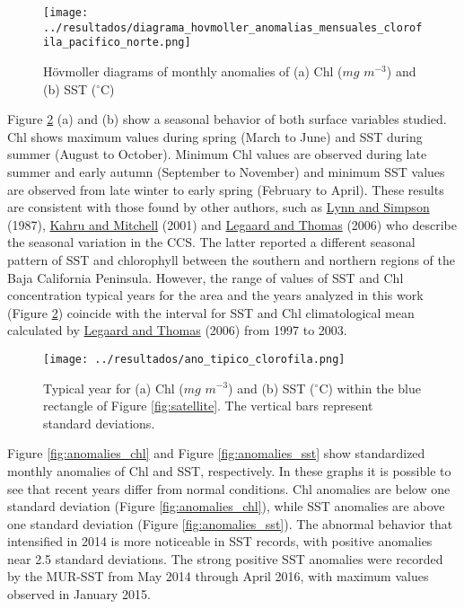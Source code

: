 \documentclass{article} %
\begin{document}
\begin{figure}
  \begin{center}
  \texttt{[image: ../resultados/diagrama\_hovmoller\_anomalias\_mensuales\_clorofila\_pacifico\_norte.png]}
  \caption{Hövmoller diagrams of monthly anomalies of (a) Chl ($mg$ $m^{-3}$) and (b) SST ($^{\circ}$C)}
  \label{fig:diagram}
  \end{center}
\end{figure}

Figure \ref{fig:typical} (a) and (b) show a seasonal behavior of both surface variables studied. Chl shows maximum values during spring (March to June) and SST during summer (August to October). Minimum Chl values are observed during late summer and early autumn (September to November) and minimum SST values are observed from late winter to early spring (February to April). These results are consistent with those found by other authors, such as \hyperlink{lynn}{Lynn and Simpson} (1987), \hyperlink{kahru}{Kahru and Mitchell} (2001) and \hyperlink{legaard}{Legaard and Thomas} (2006) who describe the seasonal variation in the CCS. The latter reported a different seasonal pattern of SST and chlorophyll between the southern and northern regions of the Baja California Peninsula. However, the range of values of SST and Chl concentration typical years for the area and the years analyzed in this work (Figure \ref{fig:typical}) coincide with the interval for SST and Chl climatological mean calculated by \hyperlink{legaard}{Legaard and Thomas} (2006) from 1997 to 2003.

\begin{figure}
  \begin{center}
  \texttt{[image: ../resultados/ano\_tipico\_clorofila.png]}
  \caption{Typical year for (a) Chl ($mg$ $m^{-3}$) and (b) SST ($^{\circ}$C) within the blue rectangle of Figure \ref{fig:satellite}. The vertical bars represent standard deviations.}
  \label{fig:typical}
  \end{center}
\end{figure}


Figure \ref{fig:anomalies_chl} and Figure \ref{fig:anomalies_sst} show standardized monthly anomalies of Chl and SST, respectively. In these graphs it is possible to see that recent years differ from normal conditions. Chl anomalies are below one standard deviation (Figure \ref{fig:anomalies_chl}), while SST anomalies are above one standard deviation (Figure \ref{fig:anomalies_sst}). The abnormal behavior that intensified in 2014 is more noticeable in SST records, with positive anomalies near 2.5 standard deviations. The strong positive SST anomalies were recorded by the MUR-SST from May 2014 through April 2016, with maximum values observed in January 2015.\\
\end{document}
